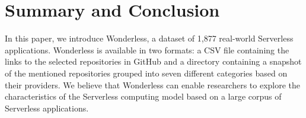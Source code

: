 \section{Summary and Conclusion}
\label{summary}

In this paper, we introduce Wonderless, a dataset of 1,877 
real-world Serverless applications. Wonderless is available in two 
formats: a CSV file containing the links to the selected repositories 
in GitHub and a directory containing a snapshot of the mentioned 
repositories grouped into seven different categories based on their providers. 
We believe that Wonderless can enable researchers to explore 
the characteristics of the Serverless computing model based on a large corpus
of Serverless applications. 





